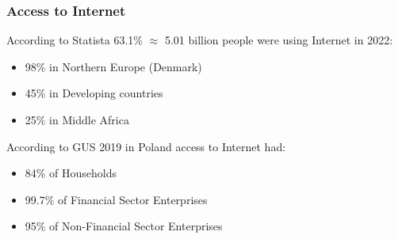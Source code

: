 \documentclass{beamer}
\begin{document}
\begin{frame}
    \frametitle{Access to Internet}
    According to Statista 63.1\% $\approx$ 5.01 billion people were using Internet in 2022:
        \begin{itemize}
            \item 98\% in Northern Europe (Denmark)
            \item 45\% in Developing countries
            \item 25\% in Middle Africa
        \end{itemize}
    According to GUS 2019 in Poland access to Internet had:
        \begin{itemize}
            \item 84\% of Households
            \item 99.7\% of Financial Sector Enterprises
            \item 95\% of Non-Financial Sector Enterprises
        \end{itemize}
\end{frame}
\end{document}
